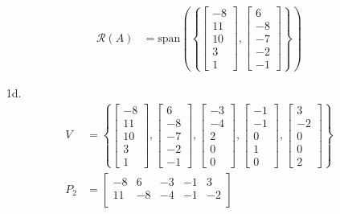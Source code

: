 \documentclass[12pt,fleqn,leqno,letterpaper]{article}
\begin{document}
\begin{enumerate}
\begin{align*}
					\mathcal{R}(A) &= \text{span}\left(\left\{
													 \begin{bmatrix} -8\\11\\10\\3\\1 \end{bmatrix},
													 \begin{bmatrix} 6\\-8\\-7\\-2\\-1 \end{bmatrix}
													 \right\}\right)
				\end{align*}
			\item[1d.]
				\begin{align*}
			  V &= \left\{
								\begin{bmatrix} -8\\11\\10\\3\\1 \end{bmatrix},
								\begin{bmatrix} 6\\-8\\-7\\-2\\-1 \end{bmatrix},
								\begin{bmatrix} -3\\-4\\2\\0\\0 \end{bmatrix},
								\begin{bmatrix} -1\\-1\\0\\1\\0 \end{bmatrix},
								\begin{bmatrix} 3\\-2\\0\\0\\2 \end{bmatrix}
					\right\}\\
					P_{2} &= \begin{bmatrix}
						-8 & 6 & -3 & -1 & 3\\
						11 & -8 & -4 & -1 & -2\\

\end{bmatrix}
\end{align*}
\end{enumerate}
\end{document}
